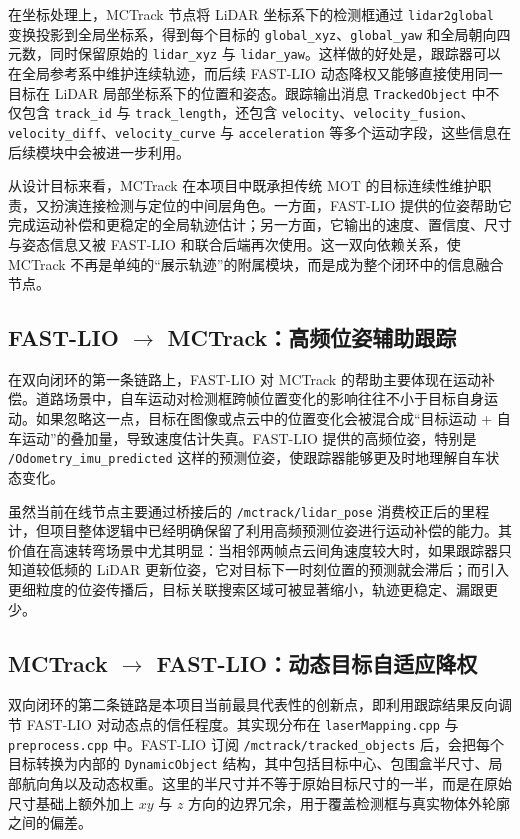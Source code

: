 \documentclass[UTF8,a4paper,12pt]{ctexart}
\begin{document}
在坐标处理上，MCTrack 节点将 LiDAR 坐标系下的检测框通过 \texttt{lidar2global} 变换投影到全局坐标系，得到每个目标的 \texttt{global\_xyz}、\texttt{global\_yaw} 和全局朝向四元数，同时保留原始的 \texttt{lidar\_xyz} 与 \texttt{lidar\_yaw}。这样做的好处是，跟踪器可以在全局参考系中维护连续轨迹，而后续 FAST-LIO 动态降权又能够直接使用同一目标在 LiDAR 局部坐标系下的位置和姿态。跟踪输出消息 \texttt{TrackedObject} 中不仅包含 \texttt{track\_id} 与 \texttt{track\_length}，还包含 \texttt{velocity}、\texttt{velocity\_fusion}、\texttt{velocity\_diff}、\texttt{velocity\_curve} 与 \texttt{acceleration} 等多个运动字段，这些信息在后续模块中会被进一步利用。

从设计目标来看，MCTrack 在本项目中既承担传统 MOT 的目标连续性维护职责，又扮演连接检测与定位的中间层角色。一方面，FAST-LIO 提供的位姿帮助它完成运动补偿和更稳定的全局轨迹估计；另一方面，它输出的速度、置信度、尺寸与姿态信息又被 FAST-LIO 和联合后端再次使用。这一双向依赖关系，使 MCTrack 不再是单纯的“展示轨迹”的附属模块，而是成为整个闭环中的信息融合节点。

\subsection{FAST-LIO $\rightarrow$ MCTrack：高频位姿辅助跟踪}
在双向闭环的第一条链路上，FAST-LIO 对 MCTrack 的帮助主要体现在运动补偿。道路场景中，自车运动对检测框跨帧位置变化的影响往往不小于目标自身运动。如果忽略这一点，目标在图像或点云中的位置变化会被混合成“目标运动 + 自车运动”的叠加量，导致速度估计失真。FAST-LIO 提供的高频位姿，特别是 \texttt{/Odometry\_imu\_predicted} 这样的预测位姿，使跟踪器能够更及时地理解自车状态变化。

虽然当前在线节点主要通过桥接后的 \texttt{/mctrack/lidar\_pose} 消费校正后的里程计，但项目整体逻辑中已经明确保留了利用高频预测位姿进行运动补偿的能力。其价值在高速转弯场景中尤其明显：当相邻两帧点云间角速度较大时，如果跟踪器只知道较低频的 LiDAR 更新位姿，它对目标下一时刻位置的预测就会滞后；而引入更细粒度的位姿传播后，目标关联搜索区域可被显著缩小，轨迹更稳定、漏跟更少。

\subsection{MCTrack $\rightarrow$ FAST-LIO：动态目标自适应降权}
双向闭环的第二条链路是本项目当前最具代表性的创新点，即利用跟踪结果反向调节 FAST-LIO 对动态点的信任程度。其实现分布在 \texttt{laserMapping.cpp} 与 \texttt{preprocess.cpp} 中。FAST-LIO 订阅 \texttt{/mctrack/tracked\_objects} 后，会把每个目标转换为内部的 \texttt{DynamicObject} 结构，其中包括目标中心、包围盒半尺寸、局部航向角以及动态权重。这里的半尺寸并不等于原始目标尺寸的一半，而是在原始尺寸基础上额外加上 \(xy\) 与 \(z\) 方向的边界冗余，用于覆盖检测框与真实物体外轮廓之间的偏差。
\end{document}
